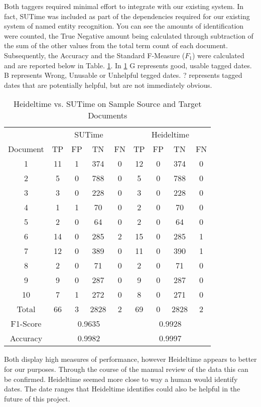 \documentclass{mprop}
\begin{document}
Both taggers required minimal effort to integrate with our existing system. In fact, SUTime was included as part of the dependencies required for our existing system of named entity recognition. You can see the amounts of identification were counted, the True Negative amount being calculated through subtraction of the sum of the other values from the total term count of each document. Subsequently, the Accuracy and the Standard F-Measure (\textbf{$ F_1 $}) were calculated and are reported below in Table. \ref{temporalcomparison}.
In \ref{temporalcomparison} G represents good, usable tagged dates. B represents Wrong, Unusable or Unhelpful tegged dates. ? represents tagged dates that are potentially helpful, but are not immediately obvious.
\begin{table}[H]
\centering
\begin{tabular}{|c|c|c|c|c|c|c|c|c|}
\hline
& \multicolumn{4}{|c|}{SUTime}    & \multicolumn{4}{|c|}{Heideltime} \\ 
\cline{2-9}
Document & TP  & FP  & TN   & FN    & TP & FP & TN   & FN    \\ \hline
1        & 11  & 1   & 374  & 0	    & 12 & 0  & 374  & 0     \\ \hline
2        & 5   & 0	 & 788  & 0	    & 5  & 0  & 788  & 0     \\ \hline
3		 & 3   & 0   & 228  & 0		& 3  & 0  & 228  & 0	 \\ \hline
4        & 1   & 1	 & 70   & 0		& 2  & 0  & 70   & 0	 \\ \hline
5	     & 2   & 0	 & 64   & 0		& 2	 & 0  & 64   & 0     \\ \hline
6		 & 14  & 0	 & 285  & 2		& 15 & 0  & 285  & 1     \\ \hline
7		 & 12  & 0	 & 389  & 0		& 11 & 0  & 390  & 1	 \\ \hline
8		 & 2   & 0	 & 71   & 0	  	& 2	 & 0  & 71   & 0	 \\ \hline
9		 & 9   & 0	 & 287  & 0		& 9	 & 0  & 287  & 0	 \\ \hline
10		 & 7   & 1	 & 272  & 0		& 8	 & 0  & 271  & 0	 \\ \hline
Total    & 66  & 3	 & 2828 & 2	  	& 69 & 0  &	2828 & 2     \\ \hline
F1-Score & \multicolumn{4}{|c|}{0.9635} & \multicolumn{4}{|c|}{0.9928} \\ \hline
Accuracy & \multicolumn{4}{|c|}{0.9982} & \multicolumn{4}{|c|}{0.9997} \\ \hline
\end{tabular}
\caption{Heideltime vs. SUTime on Sample Source and Target Documents}
\label{temporalcomparison}
\end{table}
Both display high measures of performance, however Heideltime appears to better for our purposes. Through the course of the manual review of the data this can be confirmed. Heideltime seemed more close to way a human would identify dates. The date ranges that Heideltime identifies could also be helpful in the future of this project.
\end{document}
